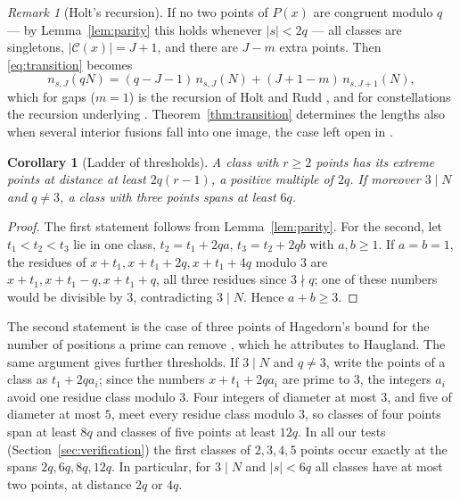 \documentclass[11pt]{article}
\newtheorem{corollary}[theorem]{Corollary}
\theoremstyle{definition}
\theoremstyle{remark}
\newtheorem{remark}[theorem]{Remark}
\newcommand{\C}{\mathcal{C}}
\begin{document}
\begin{remark}[Holt's recursion]\label{rem:holt}
If no two points of $P(x)$ are congruent modulo $q$ --- by Lemma~\ref{lem:parity} this holds whenever $|s| < 2q$ --- all classes are singletons, $|\C(x)| = J + 1$, and there are $J - m$ extra points. Then \eqref{eq:transition} becomes
\[
  n_{s,J}(qN) = (q - J - 1)\, n_{s,J}(N) + (J + 1 - m)\, n_{s,J+1}(N),
\]
which for gaps ($m = 1$) is the recursion of Holt and Rudd \cite[Thm.~3.2]{HR15}, and for constellations the recursion underlying \cite[Fig.~7]{Ho26}. Theorem~\ref{thm:transition} determines the lengths also when several interior fusions fall into one image, the case left open in \cite{HR15,Ho23}.
\end{remark}

\begin{corollary}[Ladder of thresholds]\label{cor:ladder}
A class with $r \ge 2$ points has its extreme points at distance at least $2q(r-1)$, a positive multiple of $2q$. If moreover $3 \mid N$ and $q \ne 3$, a class with three points spans at least $6q$.
\end{corollary}

\begin{proof}
The first statement follows from Lemma~\ref{lem:parity}. For the second, let $t_1 < t_2 < t_3$ lie in one class, $t_2 = t_1 + 2qa$, $t_3 = t_2 + 2qb$ with $a, b \ge 1$. If $a = b = 1$, the residues of $x + t_1, x + t_1 + 2q, x + t_1 + 4q$ modulo $3$ are $x + t_1, x + t_1 - q, x + t_1 + q$, all three residues since $3 \nmid q$; one of these numbers would be divisible by $3$, contradicting $3 \mid N$. Hence $a + b \ge 3$.
\end{proof}

The second statement is the case of three points of Hagedorn's bound for the number of positions a prime can remove \cite[Prop.~3.3]{Ha09}, which he attributes to Haugland. The same argument gives further thresholds. If $3 \mid N$ and $q \ne 3$, write the points of a class as $t_1 + 2q a_i$; since the numbers $x + t_1 + 2q a_i$ are prime to $3$, the integers $a_i$ avoid one residue class modulo $3$. Four integers of diameter at most $3$, and five of diameter at most $5$, meet every residue class modulo $3$, so classes of four points span at least $8q$ and classes of five points at least $12q$. In all our tests (Section~\ref{sec:verification}) the first classes of $2, 3, 4, 5$ points occur exactly at the spans $2q, 6q, 8q, 12q$. In particular, for $3 \mid N$ and $|s| < 6q$ all classes have at most two points, at distance $2q$ or $4q$.
\end{document}
